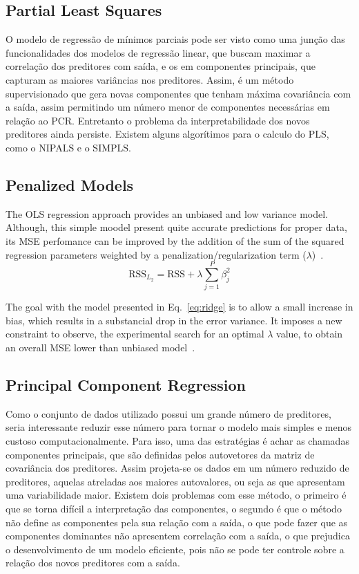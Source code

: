 \subsection{Partial Least Squares}
O modelo de regressão de mínimos parciais pode ser visto como uma junção das funcionalidades dos modelos de regressão linear, que buscam maximar a correlação dos preditores com saída, e os em componentes principais, que capturam as maiores variâncias nos preditores. Assim, é um método supervisionado que gera novas componentes que tenham máxima covariância com a saída, assim permitindo um número menor de componentes necessárias em relação ao PCR. Entretanto o problema da interpretabilidade dos novos preditores ainda persiste. Existem alguns algorítimos para o calculo do PLS, como o NIPALS e o SIMPLS.


\subsection{Penalized Models}
The OLS regression approach provides an unbiased and low variance model. Although, this simple moodel present quite accurate predictions for proper data, its MSE perfomance can be improved by the addition of the sum of the squared regression parameters weighted by a penalization/regularization term ($\lambda$)~\cite{Kuhn2013}.
\begin{equation}
  \text{RSS}_{L_2} = \text{RSS} + \lambda \sum_{j = 1}^{P} \beta_{j}^2
  \label{eq:ridge}
\end{equation}

The goal with the model presented in Eq.~\ref{eq:ridge} is to allow a small increase in bias, which results in a substancial drop in the error variance. It imposes a new constraint to observe, the experimental search for an optimal $\lambda$ value, to obtain an overall MSE lower than unbiased model~\cite{James2013, Kuhn2013}.


\subsection{Principal Component Regression}
Como o conjunto de dados utilizado possui um grande
número de preditores, seria interessante reduzir esse número para tornar o modelo mais simples e menos custoso computacionalmente. Para isso, uma das estratégias é achar as chamadas componentes principais, que são definidas pelos autovetores da matriz de covariância dos preditores. Assim projeta-se os dados em um número reduzido de preditores, aquelas atreladas aos maiores autovalores, ou seja as que apresentam uma variabilidade maior. Existem dois problemas com esse método, o primeiro é que se torna difícil a interpretação das componentes, o segundo é que o método não define as componentes pela sua relação com a saída, o que pode fazer que as componentes dominantes não apresentem correlação com a saída, o que prejudica o desenvolvimento de um modelo eficiente, pois não se pode ter controle sobre a relação dos novos preditores com a saída.

